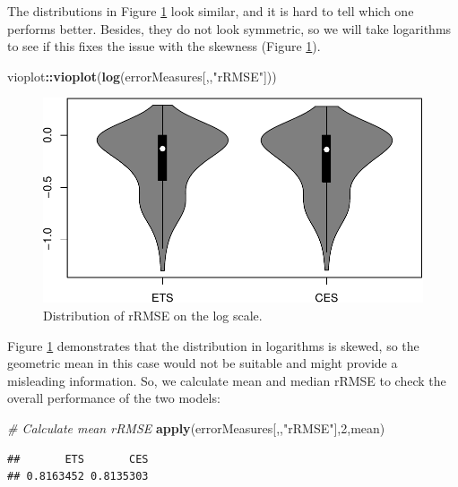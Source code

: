 \documentclass[]{book}
\newenvironment{Shaded}{\begin{snugshade}}{\end{snugshade}}
\newcommand{\CommentTok}[1]{\textcolor[rgb]{0.56,0.35,0.01}{\textit{#1}}}
\newcommand{\DecValTok}[1]{\textcolor[rgb]{0.00,0.00,0.81}{#1}}
\newcommand{\KeywordTok}[1]{\textcolor[rgb]{0.13,0.29,0.53}{\textbf{#1}}}
\newcommand{\NormalTok}[1]{#1}
\newcommand{\OperatorTok}[1]{\textcolor[rgb]{0.81,0.36,0.00}{\textbf{#1}}}
\newcommand{\StringTok}[1]{\textcolor[rgb]{0.31,0.60,0.02}{#1}}
\theoremstyle{definition}
\theoremstyle{definition}
\theoremstyle{definition}
\theoremstyle{definition}
\theoremstyle{remark}
\begin{document}
The distributions in Figure \ref{fig:errorMeasuresrRMSEDistLog} look similar, and it is hard to tell which one performs better. Besides, they do not look symmetric, so we will take logarithms to see if this fixes the issue with the skewness (Figure \ref{fig:errorMeasuresrRMSEDistLog}).

\begin{Shaded}
\begin{Highlighting}[]
\NormalTok{vioplot}\OperatorTok{::}\KeywordTok{vioplot}\NormalTok{(}\KeywordTok{log}\NormalTok{(errorMeasures[,,}\StringTok{"rRMSE"}\NormalTok{]))}
\end{Highlighting}
\end{Shaded}

\begin{figure}
\centering
\includegraphics{Svetunkov--2022----ADAM_files/figure-latex/errorMeasuresrRMSEDistLog-1.pdf}
\caption{\label{fig:errorMeasuresrRMSEDistLog}Distribution of rRMSE on the log scale.}
\end{figure}

Figure \ref{fig:errorMeasuresrRMSEDistLog} demonstrates that the distribution in logarithms is skewed, so the geometric mean in this case would not be suitable and might provide a misleading information. So, we calculate mean and median rRMSE to check the overall performance of the two models:

\begin{Shaded}
\begin{Highlighting}[]
\CommentTok{# Calculate mean rRMSE}
\KeywordTok{apply}\NormalTok{(errorMeasures[,,}\StringTok{"rRMSE"}\NormalTok{],}\DecValTok{2}\NormalTok{,mean)}
\end{Highlighting}
\end{Shaded}

\begin{verbatim}
##       ETS       CES 
## 0.8163452 0.8135303
\end{verbatim}
\end{document}
